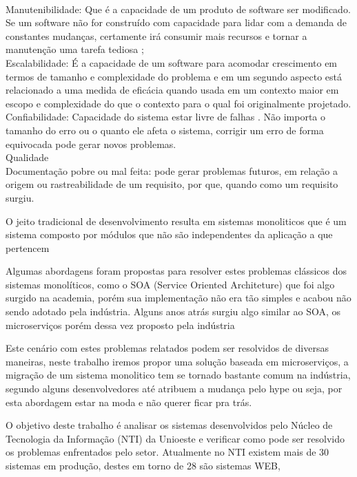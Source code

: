 \documentclass[12pt]{article}
\begin{document}
\\Manutenibilidade: Que é a capacidade de um produto de software ser modificado. Se um software não for construído com capacidade para lidar com a demanda de constantes mudanças, certamente irá consumir mais recursos e tornar a manutenção uma tarefa tediosa \cite{Velmourougan2014};
\\Escalabilidade: É a capacidade de um software para acomodar crescimento em termos de tamanho e complexidade do problema e em um segundo aspecto está relacionado a uma medida de eficácia quando usada em um contexto maior em escopo e complexidade do que o contexto para o qual foi originalmente projetado. \cite{Ibrahim2009}
\\Confiabilidade: Capacidade do sistema estar livre de falhas \cite{pan1999}. Não importa o tamanho do erro ou o quanto ele afeta o sistema, corrigir um erro de forma equivocada pode gerar novos problemas.
\\Qualidade
\\Documentação pobre ou mal feita: pode gerar problemas futuros, em relação a origem ou rastreabilidade de um requisito, por que, quando como um requisito surgiu.

O jeito tradicional de desenvolvimento resulta em sistemas monoliticos que é um sistema composto por módulos que não são independentes da aplicação a que pertencem \cite{Dragoni}

Algumas abordagens foram propostas para resolver estes problemas clássicos dos sistemas monolíticos, como o SOA (Service Oriented Architeture) que foi algo surgido na academia, porém sua implementação não era tão simples e acabou não sendo adotado pela indústria. Alguns anos atrás surgiu algo similar ao SOA, os microserviços porém dessa vez proposto pela indústria

Este cenário com estes problemas relatados podem ser resolvidos de diversas maneiras, neste trabalho iremos propor uma solução baseada em microserviços, a migração de um sistema monolitico tem se tornado bastante comum na indústria, segundo \cite{Carvalho} alguns desenvolvedores até atribuem a mudança pelo hype ou seja, por esta abordagem estar na moda e não querer ficar pra trás.


O objetivo deste trabalho é analisar os sistemas desenvolvidos pelo Núcleo de Tecnologia da Informação (NTI) da Unioeste e verificar como pode ser resolvido os problemas enfrentados pelo setor. Atualmente no NTI existem mais de 30 sistemas em produção, destes em torno de 28 são sistemas WEB, 
\end{document}
